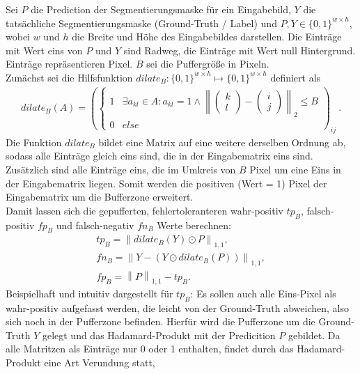 Sei $P$ die Prediction der Segmentierungsmaske für ein Eingabebild, $Y$ die tatsächliche Segmentierungsmaske (Ground-Truth / Label)
und $P, Y \in \{0, 1\}^{w{\times}h}$, wobei $w$ und $h$ die Breite und Höhe des Eingabebildes darstellen.
Die Einträge mit Wert eins von $P$ und $Y$ sind Radweg, die Einträge mit Wert null Hintergrund. Einträge repräsentieren Pixel.
$B$ sei die Puffergröße in Pixeln. \\
Zunächst sei die Hilfsfunktion $dilate_B: \{0,1\}^{w{\times}h} \mapsto \{0,1\}^{w{\times}h}$ definiert als 
\newcommand{\norm}[1]{\left\lVert#1\right\rVert}
\begin{align}
	\label{eq:dilate} dilate_B(A) = \left( \begin{cases} 
		1 & \exists a_{kl} \in A: a_{kl} = 1 \land \norm{
			\begin{pmatrix} k \\ l \end{pmatrix} - \begin{pmatrix} i \\ j \end{pmatrix} }_2 \leq B \\
		0 & else 
	\end{cases} \right)_{ij}~.
\end{align}
Die Funktion $dilate_B$ bildet eine Matrix auf eine weitere derselben Ordnung ab, 
sodass alle Einträge gleich eins sind, die in der Eingabematrix eins sind. Zusätzlich sind alle Einträge eins, 
die im Umkreis von $B$ Pixel um eine Eins in der Eingabematrix liegen. Somit werden die positiven (Wert = 1)
Pixel der Eingabematrix um die Bufferzone erweitert.  \\
Damit lassen sich die gepufferten, fehlertoleranteren wahr-positiv $tp_B$, falsch-positiv $fp_B$ und 
falsch-negativ $fn_B$ Werte berechnen: 
\begin{align}
	\label{eq:buffering} {tp}_B = \norm{dilate_{B}(Y) \odot P}_{1,1} , \\
	fn_B = \norm{Y - (Y \odot dilate_{B}(P))}_{1,1} , \\
	{fp}_B = \norm{P}_{1,1} - {tp}_B .
\end{align}
Beispielhaft und intuitiv dargestellt für $tp_B$: Es sollen auch alle Eins-Pixel als wahr-positiv aufgefasst werden,
die leicht von der Ground-Truth abweichen, also sich noch in der Pufferzone befinden. 
Hierfür wird die Pufferzone um die Ground-Truth $Y$ gelegt und das Hadamard-Produkt mit der Predicition $P$ gebildet.
Da alle Matritzen als Einträge nur 0 oder 1 enthalten, findet durch das Hadamard-Produkt eine Art Verundung statt, 
